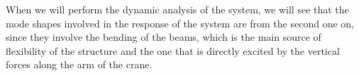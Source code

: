 When we will perform the dynamic analysis of the system, we will see that the mode shapes involved in the response of the system are from the second one on, since they involve the bending of the beams, which is the main source of flexibility of the structure and the one that is directly excited by the vertical forces along the arm of the crane.